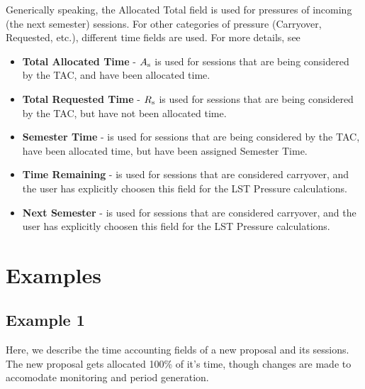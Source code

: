 \documentclass{article}
\begin{document}
   Generically speaking, the Allocated Total field is used for pressures of incoming (the next semester) sessions.  For other categories of pressure (Carryover, Requested, etc.), different time fields are used.  For more details, see \cite{marganian12a}

\begin{itemize}   
\item {\bf Total Allocated Time}  - $A_{\rm s}$ is used for sessions that are being considered by the TAC, and have been allocated time.
\item {\bf Total Requested Time} - $R_{\rm s}$ is used for sessions that are being considered by the TAC, but have not been allocated time.
\item {\bf Semester Time} - is used for sessions that are being considered by the TAC, have been allocated time, but have been assigned Semester Time.
\item {\bf Time Remaining }- is used for sessions that are considered carryover, and the user has explicitly choosen this field for the LST Pressure calculations.
\item {\bf Next Semester } - is used for sessions that are considered carryover, and the user has explicitly choosen this field for the LST Pressure calculations.  
\end{itemize}   

\section{Examples}

\subsection{Example 1}
Here, we describe the time accounting fields of a new proposal and its sessions.  The new proposal gets allocated 100\% of it's time, though changes are made to accomodate monitoring and period generation.
\end{document}

